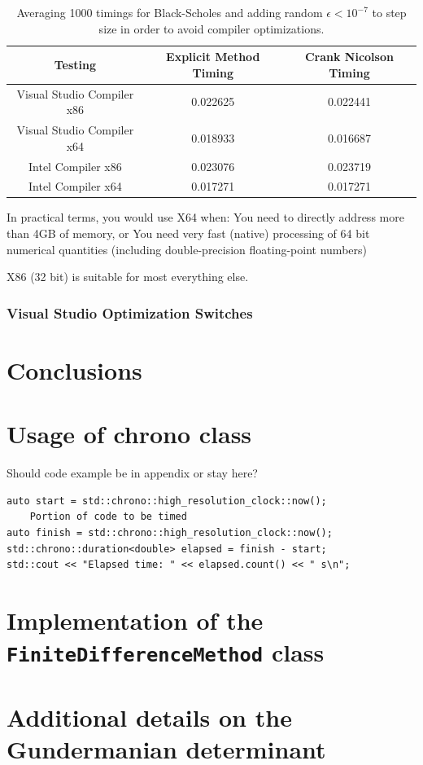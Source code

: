 \documentclass[12pt, oneside]{book}
\theoremstyle{plain}
\theoremstyle{definition}
\begin{document}
\begin{table}[htp!]
\centering
 \begin{tabular}{||c c c||} 
 \hline
 Testing & Explicit Method Timing & Crank Nicolson Timing\\ [0.5ex] 
 \hline\hline\hline
 Visual Studio Compiler x86 & 0.022625 & 0.022441\\ 
 Visual Studio Compiler x64 & 0.018933 & 0.016687
\\
 Intel Compiler x86 & 0.023076 & 0.023719\\
 Intel Compiler x64 & 0.017271 & 0.017271\\[1ex] 
 \hline
 \end{tabular}
 \caption{Averaging 1000 timings for Black-Scholes and adding random $\epsilon < 10^{-7} $ to step size in order to avoid compiler optimizations.}
\end{table}



In practical terms, you would use X64 when:  You need to directly address more than 4GB of memory, or
    You need very fast (native) processing of 64 bit numerical quantities (including double-precision floating-point numbers)

X86 (32 bit) is suitable for most everything else.



\subsection{Visual Studio Optimization Switches}



\chapter{Conclusions}


\appendix
\chapter{Usage of chrono class}
Should code example be in appendix or stay here?
\begin{verbatim}
auto start = std::chrono::high_resolution_clock::now();
    Portion of code to be timed
auto finish = std::chrono::high_resolution_clock::now();
std::chrono::duration<double> elapsed = finish - start;
std::cout << "Elapsed time: " << elapsed.count() << " s\n";
\end{verbatim}

\chapter{Implementation of the {\tt FiniteDifferenceMethod} class}
\lipsum[10]
\chapter[shorter running title]{Additional details on the Gundermanian determinant}
\lipsum[10]    



\end{document}
